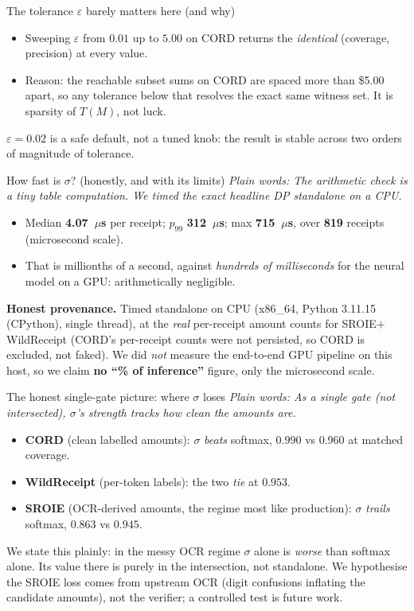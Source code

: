 \documentclass[aspectratio=169]{beamer}
\newcommand{\latMedian}{4.07}
\newcommand{\latPNineNine}{312}
\newcommand{\latMax}{715}
\newcommand{\latN}{819}
\newcommand{\latUnit}{\ensuremath{\mu}s}
\newcommand{\latHardware}{x86\_64, Python 3.11.15 (CPython), single thread}
\newcommand{\keybox}[1]{\begin{center}\colorbox{grey!15}{\parbox{0.92\linewidth}{\centering #1}}\end{center}}
\newcommand{\plain}[1]{\textit{\textcolor{sig}{Plain words:} #1}}
\begin{document}
\begin{frame}{The tolerance $\varepsilon$ barely matters here (and why)}
\begin{itemize}
\item Sweeping $\varepsilon$ from $0.01$ up to $5.00$ on CORD
returns the \emph{identical} (coverage, precision) at every value.
\item Reason: the reachable subset sums on CORD are spaced more than
\$5.00 apart, so any tolerance below that resolves the exact same
witness set. It is sparsity of $T(M)$, not luck.
\end{itemize}
\keybox{$\varepsilon{=}0.02$ is a safe default, not a tuned knob:
the result is stable across two orders of magnitude of tolerance.}
\end{frame}

\begin{frame}{How fast is $\sigma$? (honestly, and with its limits)}
\plain{The arithmetic check is a tiny table computation. We timed the
\emph{exact} headline DP standalone on a CPU.}
\begin{itemize}
\item Median \textbf{\latMedian~\latUnit{}} per receipt; $p_{99}$
\textbf{\latPNineNine~\latUnit{}}; max \textbf{\latMax~\latUnit{}},
over \textbf{\latN{}} receipts (microsecond scale).
\item That is millionths of a second, against \emph{hundreds of
milliseconds} for the neural model on a GPU: arithmetically negligible.
\end{itemize}
\keybox{\textbf{Honest provenance.} Timed standalone on CPU
(\latHardware), at the \emph{real} per-receipt amount counts for
SROIE${+}$WildReceipt (CORD's per-receipt counts were not persisted,
so CORD is excluded, not faked). We did \emph{not} measure the
end-to-end GPU pipeline on this host, so we claim \textbf{no
``\% of inference''} figure, only the microsecond scale.}
\end{frame}

\begin{frame}{The honest single-gate picture: where $\sigma$ loses}
\plain{As a \emph{single} gate (not intersected), $\sigma$'s strength
tracks how clean the amounts are.}
\begin{itemize}
\item \textbf{CORD} (clean labelled amounts): $\sigma$
\emph{beats} softmax, $0.990$ vs $0.960$ at matched coverage.
\item \textbf{WildReceipt} (per-token labels): the two \emph{tie} at
$0.953$.
\item \textbf{SROIE} (OCR-derived amounts, the regime most like
production): $\sigma$ \textcolor{bad}{\emph{trails} softmax,
$0.863$ vs $0.945$}.
\end{itemize}
\keybox{We state this plainly: in the messy OCR regime $\sigma$ alone
is \emph{worse} than softmax alone. Its value there is purely in the
intersection, not standalone. We hypothesise the SROIE loss comes from
upstream OCR (digit confusions inflating the candidate amounts), not
the verifier; a controlled test is future work.}
\end{frame}
\end{document}
